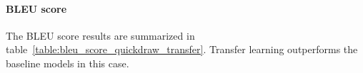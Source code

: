 
      \paragraph{BLEU score}
        The BLEU score results are summarized in table~\ref{table:bleu_score_quickdraw_transfer}. Transfer learning outperforms the baseline models in this case.

